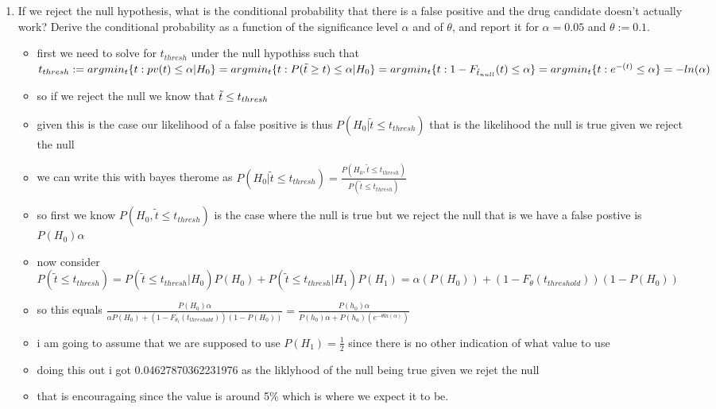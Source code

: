 \documentclass[12pt,twoside]{article}
\begin{document}
\begin{enumerate}
\begin{enumerate}
\item If we reject the null hypothesis, what is the conditional probability that there is a false positive and the drug candidate doesn't actually work? Derive the conditional probability as a function of the significance level $\alpha$ and of $\theta$, and report it for $\alpha = 0.05$ and $\theta:=0.1$. 
\begin{itemize}
  \color{blue}
  \item first we need to solve for $t_{thresh}$ under the null hypothiss such that $t_{thresh}:=argmin_{t}\{ t:pv(t)\leq \alpha | H_{0}\}=argmin_{t}\{ t:P(\Tilde{t}\geq t)\leq \alpha | H_{0}\}
  =argmin_{t}\{t:1-F_{\tilde{t}_{null}}(t)\leq \alpha\}=argmin_{t}\{t:e^{-(t)}\leq \alpha\}=-ln(\alpha)$
  \item so if we reject the null we know that $\Tilde{t}\leq t_{thresh}$
  \item given this is the case our likelihood of a false positive is thus $P(H_{0}|\tilde{t}\leq t_{thresh})$ that is the likelihood the null is true given we reject the null 
  \item we can write this with bayes therome as  $P(H_{0}|\tilde{t}\leq t_{thresh})=\frac{P(H_{0},\tilde{t}\leq t_{thresh})}{P(\tilde{t}\leq t_{thresh})}$
  \item so first we know $P(H_0, \tilde{t}\leq t_{thresh})$ is the case where the null is true but we reject the null that is we have a false postive is $P(H_0)\alpha$
  \item now consider $P(\tilde{t}\leq t_{thresh})=P(\tilde{t}\leq t_{thresh}|H_0)P(H_0)+P(\tilde{t}\leq t_{thresh}|H_1)P(H_1)=\alpha(P(H_0))+(1-F_{\theta}(t_{threshold}))(1-P(H_0))$
  \item so this equals $\frac{P(H_0)\alpha}{\alpha P(H_0)  +(1-F_{\theta_t}(t_{threshold}))(1-P(H_0)) }=\frac{P(h_0)\alpha
  }{P(h_0)\alpha + P(h_a)(e^{-\theta ln(\alpha)})}$  
  \item i am going to assume that we are supposed to use $P(H_1)=\frac{1}{2}$ since there is no other indication of what value to use 
  \item doing this out i got 0.04627870362231976 as the liklyhood of the null being true  given we rejet the null
  \item that is encouragaing since the value is around 5\% which is where we expect it to be. 
\end{itemize}



\end{enumerate}
\end{enumerate}
\end{document}
